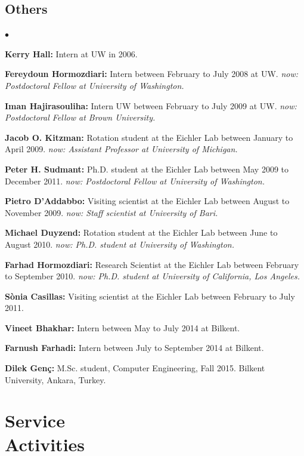 \documentclass[margin,line]{res}
\newenvironment{list2}{
  \begin{list}{$\bullet$}{%
      \setlength{\itemsep}{0in}
      \setlength{\parsep}{0in} \setlength{\parskip}{0in}
      \setlength{\topsep}{0in} \setlength{\partopsep}{0in} 
      \setlength{\leftmargin}{0.2in}}}{\end{list}}
\begin{document}
\begin{resume}
\subsection{\small \sc Others}
\begin{list2}
\item
{\bf Kerry Hall:} Intern at UW in 2006. 
\item
{\bf Fereydoun Hormozdiari:} Intern between February to July 2008 at UW. 
{\it now: Postdoctoral Fellow at University of Washington.}
\item
{\bf Iman Hajirasouliha:}  Intern UW between February to July 2009 at UW.
{\it now: Postdoctoral Fellow at Brown University.}
\item
{\bf Jacob O. Kitzman:} Rotation student at the Eichler Lab between January to April 2009.
{\it now: Assistant Professor at University of Michigan.}
\item
{\bf Peter H. Sudmant:} Ph.D. student at the Eichler Lab between May 2009 to December 2011.
{\it now: Postdoctoral Fellow at University of Washington.}
\item
{\bf Pietro D'Addabbo:} Visiting scientist at the Eichler Lab between August to November 2009.
{\it now: Staff scientist at University of Bari.}
\item
{\bf Michael Duyzend:} Rotation student at the Eichler Lab between June to August 2010.
{\it now: Ph.D. student at University of Washington.}
\item
{\bf Farhad Hormozdiari:} Research Scientist at the Eichler Lab between February to September 2010.
{\it now: Ph.D. student at University of California, Los Angeles.}
\item
{\bf S\`{o}nia Casillas:} Visiting scientist at the Eichler Lab between February to July 2011.
\item
{\bf Vineet Bhakhar:} Intern between May to July 2014 at Bilkent. 
\item
{\bf Farnush Farhadi:} Intern between July to September 2014 at Bilkent. 
\item
  {\bf Dilek Genç:} M.Sc. student, Computer Engineering, Fall 2015.
  Bilkent University, Ankara, Turkey. 
\end{list2}

\vspace*{-.2cm}
\section{\sc Service \\ Activities}
\vspace{-0.3cm}

\end{resume}
\end{document}
